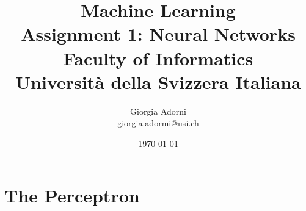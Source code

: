 \documentclass[12pt]{article}
\title{Machine Learning \\ \Large{Assignment 1: Neural Networks} \\[0.3em] \normalsize{Faculty of Informatics} \\ \normalsize{Università della Svizzera Italiana}}
\author {{Giorgia Adorni}	\\ \normalsize{giorgia.adormi@usi.ch}}
\date{\today}
\begin{document}
 


\maketitle 



\section{The Perceptron}



\printbibliography
\nocite{*}
\end{document}
